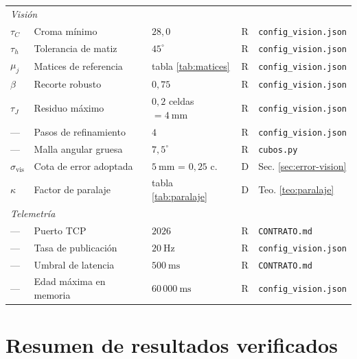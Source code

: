 \documentclass[11pt,a4paper]{article}
\theoremstyle{definition}
\newcommand{\grados}{^{\circ}}
\begin{document}
\begin{table}[htbp]
\begin{tabular}{llllp{4.2cm}}
\midrule
\multicolumn{5}{l}{\textit{Visión}}\\
$\tau_C$ & Croma mínimo & $28{,}0$ & R & \texttt{config\_vision.json} \\
$\tau_h$ & Tolerancia de matiz & $45\grados$ & R & \texttt{config\_vision.json} \\
$\mu_j$ & Matices de referencia & tabla \ref{tab:matices} & R & \texttt{config\_vision.json} \\
$\beta$ & Recorte robusto & $0{,}75$ & R & \texttt{config\_vision.json} \\
$\tau_J$ & Residuo máximo & $0{,}2$ celdas $=4\ \mathrm{mm}$ & R & \texttt{config\_vision.json} \\
--- & Pasos de refinamiento & $4$ & R & \texttt{config\_vision.json} \\
--- & Malla angular gruesa & $7{,}5\grados$ & R & \texttt{cubos.py} \\
$\sigma_{\mathrm{vis}}$ & Cota de error adoptada & $5\ \mathrm{mm}$ = $0{,}25$ c. & D & Sec. \ref{sec:error-vision} \\
$\kappa$ & Factor de paralaje & tabla \ref{tab:paralaje} & D & Teo. \ref{teo:paralaje} \\
\midrule
\multicolumn{5}{l}{\textit{Telemetría}}\\
--- & Puerto TCP & $2026$ & R & \texttt{CONTRATO.md} \\
--- & Tasa de publicación & $20\ \mathrm{Hz}$ & R & \texttt{config\_vision.json} \\
--- & Umbral de latencia & $500\ \mathrm{ms}$ & R & \texttt{CONTRATO.md} \\
--- & Edad máxima en memoria & $60\,000\ \mathrm{ms}$ & R & \texttt{config\_vision.json} \\
\bottomrule
\end{tabular}
\label{tab:parametros}
\end{table}

\section{Resumen de resultados verificados}
\end{document}
